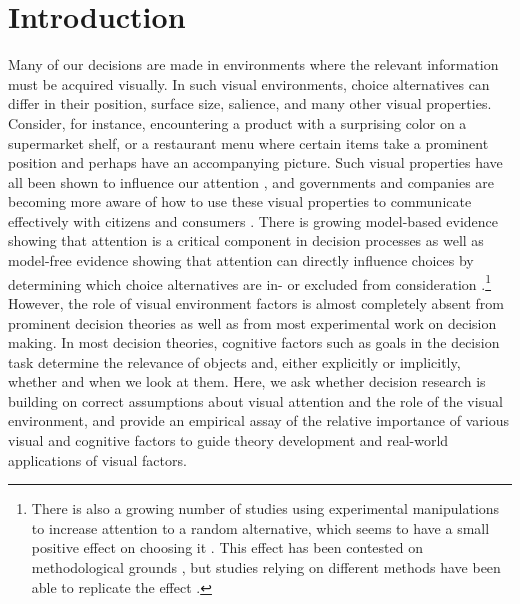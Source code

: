 
\section{Introduction}

Many of our decisions are made in environments where the relevant information must be acquired visually. In such visual environments, choice alternatives can differ in their position, surface size, salience, and many other visual properties. Consider, for instance, encountering a product with a surprising color on a supermarket shelf, or a restaurant menu where certain items take a prominent position and perhaps have an accompanying picture. Such visual properties have all been shown to influence our attention \citep{corbetta2002a,borji2012a,dehaene2003a,clarke2014a, rosenholtz2007a}, and governments and companies are becoming more aware of how to use these visual properties to communicate effectively with citizens and consumers \citep{orquinwedel2020}. There is growing model-based evidence showing that attention is a critical component in decision processes \citep{krajbich2010a, stojic2020uncertainty, callaway2019a, gluth2018, gluth2020} as well as model-free evidence showing that attention can directly influence choices by determining which choice alternatives are in- or excluded from consideration \citep{chandon2009a, gidlof2013, gidloef2017a}.\footnote{There is also a growing number of studies using experimental manipulations to increase attention to a random alternative, which seems to have a small positive effect on choosing it \citep{armel2008, paernamets2015a, shimojo2003a}. This effect has been contested on methodological grounds \citep{Newell2018, ghaffari2018a}, but studies relying on different methods have been able to replicate the effect \citep{liu2020a, Fisher2020}.} However, the role of visual environment factors is almost completely absent from prominent decision theories as well as from most experimental work on decision making. In most decision theories, cognitive factors such as goals in the decision task determine the relevance of objects and, either explicitly or implicitly, whether and when we look at them. Here, we ask whether decision research is building on correct assumptions about visual attention and the role of the visual environment, and provide an empirical assay of the relative importance of various visual and cognitive factors to guide theory development and real-world applications of visual factors.

